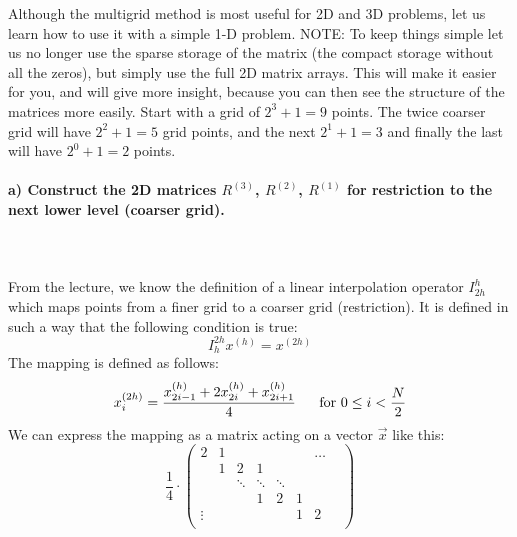Although the multigrid method is most useful for 2D and 3D problems, 
let us learn how to use it with a simple 1-D problem.
NOTE: To keep things simple let us no longer use the sparse storage of 
the matrix (the compact storage without all the zeros), but simply use 
the full 2D matrix arrays. This will make it easier for you, and will 
give more insight, because you can then see the structure of the 
matrices more easily.
Start with a grid of $2^3+1=9$ points. The twice coarser grid will have 
$2^2+1=5$ grid points, and the next $2^1+1=3$ and finally the last will 
have $2^0+1=2$ points.

\paragraph{
    a) Construct the 2D matrices $R^{(3)}$, $R^{(2)}$, $R^{(1)}$ 
    for restriction to the next lower level (coarser grid).
} \ \\
    \\
    From the lecture, we know the definition of a linear 
    interpolation operator $I_{2h}^h$ which maps points from 
    a finer grid to a coarser grid (restriction).  It is 
    defined in such a way that the following condition is true:
    \begin{equation}
        I_h^{2h}x^{(h)}=x^{(2h)}
    \end{equation}
    The mapping is defined as follows:
    \begin{equation}
        x_i^{(2h)}=
        \frac{x_{2i-1}^{(h)}+2x_{2i}^{(h)}+x_{2i+1}^{(h)}}{4}
        \ \ \ \ \ 
        \textnormal{for }0\leq i<\frac{N}{2}
    \end{equation}
    We can express the mapping as a matrix acting on a vector 
    $\vec x$ like this:
    \begin{equation}
        \frac{1}{4}\cdot        
        \begin{pmatrix}
            2      & 1 &    &   &        &        & \hdots & \\
                   & 1 & 2  & 1 &        &        &        & \\
                   &   & \ddots & \ddots & \ddots &        & \\
                   &   &        & 1      & 2      & 1      & \\
            \vdots &   &        &        &        & 1      & 2 \\
        \end{pmatrix}
    \end{equation}

